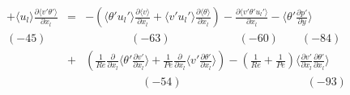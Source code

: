 \documentclass[a4paper,11pt]{article}
\begin{document}
\begin{eqnarray}
+\langle u_l\rangle \frac{\partial \langle v'\theta'\rangle }{\partial x_l}
&=&-(\langle \theta'u_l'\rangle \frac{\partial \langle v \rangle  }{\partial x_l}
+\langle v'u_l'\rangle \frac{\partial \langle \theta \rangle  }{\partial x_l})
-\frac{\partial \langle v'\theta'u_l'\rangle}{\partial x_l}  %
-\langle \theta' \frac{\partial p' }{\partial y}\rangle \nonumber \\
(-45) \quad{}   && \quad{} \qquad{} \quad{} (-63)\qquad{}\qquad{}\qquad{} (-60)\qquad{} (-84) \nonumber \\
&+&(\frac{1}{Re}\frac{\partial }{\partial x_l}\langle \theta' \frac{\partial v' }{\partial x_l}\rangle+\frac{1}{Pe}\frac{\partial }{\partial x_l}\langle v'\frac{\partial \theta' }{\partial x_l}\rangle )
-(\frac{1}{Re}+\frac{1}{Pe})\langle \frac{\partial v' }{\partial x_l}\frac{\partial \theta' }{\partial x_l}\rangle  \\
&& \quad{}\qquad{} \quad{} \quad{}(-54)\qquad{}\qquad{}\qquad{}\qquad{}\quad{}\qquad{} (-93) \nonumber
\end{eqnarray}
\end{document}
